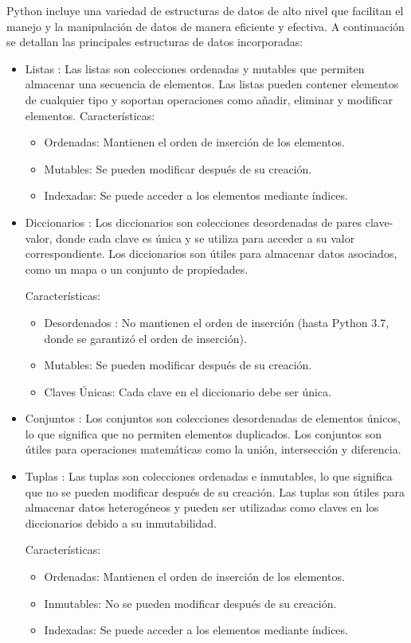 \documentclass[10pt,a4paper]{article}
\begin{document}
Python incluye una variedad de estructuras de datos de alto nivel que facilitan el manejo y la manipulación de datos de manera eficiente y efectiva. A continuación se detallan las principales estructuras de datos incorporadas:
\begin{itemize}
    
\item Listas : Las listas son colecciones ordenadas y mutables que permiten almacenar una secuencia de elementos. Las listas pueden contener elementos de cualquier tipo y soportan operaciones como añadir, eliminar y modificar elementos.
Características:
\begin{itemize}
 \item Ordenadas: Mantienen el orden de inserción de los elementos.
 \item Mutables: Se pueden modificar después de su creación.
 \item Indexadas: Se puede acceder a los elementos mediante índices.
\end{itemize}
\item Diccionarios : Los diccionarios son colecciones desordenadas de pares clave-valor, donde cada clave es única y se utiliza para acceder a su valor correspondiente. Los diccionarios son útiles para almacenar datos asociados, como un mapa o un conjunto de propiedades.

Características:
\begin{itemize}
    \item Desordenados : No mantienen el orden de inserción (hasta Python 3.7, donde se garantizó el orden de inserción).
    \item Mutables: Se pueden modificar después de su creación.
    \item Claves Únicas: Cada clave en el diccionario debe ser única.
\end{itemize}
\item  Conjuntos : Los conjuntos son colecciones desordenadas de elementos únicos, lo que significa que no permiten elementos duplicados. Los conjuntos son útiles para operaciones matemáticas como la unión, intersección y diferencia.

\item Tuplas : Las tuplas son colecciones ordenadas e inmutables, lo que significa que no se pueden modificar después de su creación. Las tuplas son útiles para almacenar datos heterogéneos y pueden ser utilizadas como claves en los diccionarios debido a su inmutabilidad.

Características:
\begin{itemize}
    \item Ordenadas: Mantienen el orden de inserción de los elementos.
    \item Inmutables: No se pueden modificar después de su creación.
    \item Indexadas: Se puede acceder a los elementos mediante índices.
\end{itemize}
\end{itemize}
\end{document}
